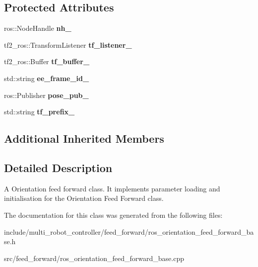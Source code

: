 \subsection*{Protected Attributes}
\begin{DoxyCompactItemize}
\item 
\mbox{\label{classRosOrientationFeedForwardBase_afa860a801df238863c9f4d914b84cad2}} 
ros\+::\+Node\+Handle {\bfseries nh\+\_\+}
\item 
\mbox{\label{classRosOrientationFeedForwardBase_a056eabe353a9b022e78f00432cc0451e}} 
tf2\+\_\+ros\+::\+Transform\+Listener {\bfseries tf\+\_\+listener\+\_\+}
\item 
\mbox{\label{classRosOrientationFeedForwardBase_af31a9db484070b9498d11c89d3c60def}} 
tf2\+\_\+ros\+::\+Buffer {\bfseries tf\+\_\+buffer\+\_\+}
\item 
\mbox{\label{classRosOrientationFeedForwardBase_a746bcb2db8165ad31cbe285be7ed9c23}} 
std\+::string {\bfseries ee\+\_\+frame\+\_\+id\+\_\+}
\item 
\mbox{\label{classRosOrientationFeedForwardBase_a71880189563e228e26ce9561e085a625}} 
ros\+::\+Publisher {\bfseries pose\+\_\+pub\+\_\+}
\item 
\mbox{\label{classRosOrientationFeedForwardBase_a0ac4ea0415e293dbe56fa214c1acb3fc}} 
std\+::string {\bfseries tf\+\_\+prefix\+\_\+}
\end{DoxyCompactItemize}
\subsection*{Additional Inherited Members}


\subsection{Detailed Description}
A Orientation feed forward class. It implements parameter loading and initialisation for the Orientation Feed Forward class. 

The documentation for this class was generated from the following files\+:\begin{DoxyCompactItemize}
\item 
include/multi\+\_\+robot\+\_\+controller/feed\+\_\+forward/ros\+\_\+orientation\+\_\+feed\+\_\+forward\+\_\+base.\+h\item 
src/feed\+\_\+forward/ros\+\_\+orientation\+\_\+feed\+\_\+forward\+\_\+base.\+cpp\end{DoxyCompactItemize}
